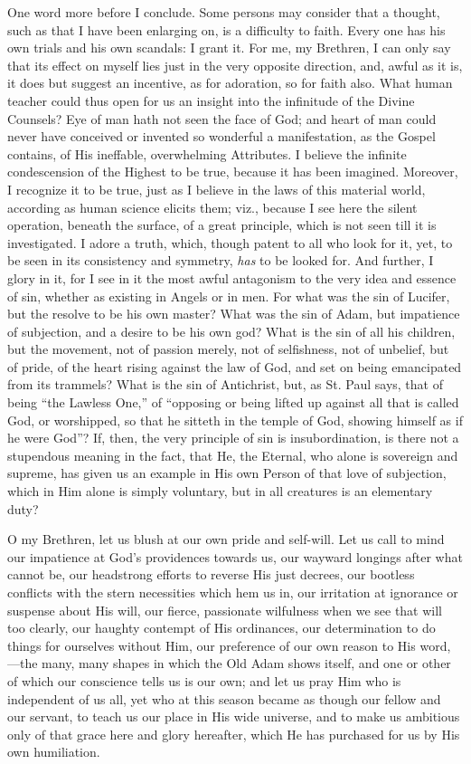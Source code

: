 One word more before I conclude. Some persons may
consider that a thought, such as that I have been
enlarging on, is a difficulty to faith. Every one has his
own trials and his own scandals: I grant it. For me, my
Brethren, I can only say that its effect on myself lies
just in the very opposite direction, and, awful as it is,
it does but suggest an incentive, as for adoration, so
for faith also. What human teacher could thus open for us
an insight into the infinitude of the Divine Counsels?
Eye of man hath not seen the face of God; and heart of
man could never have conceived or invented so wonderful a
manifestation, as the Gospel contains, of His ineffable,
overwhelming Attributes. I believe the infinite
condescension of the Highest to be true, because it has
been imagined. Moreover, I recognize it to be true, just
as I believe in the laws of this material world,
according as human science elicits them; viz., because I
see here the silent operation, beneath the surface, of a
great principle, which is not seen till it is
investigated. I adore a truth, which, though patent to
all who look for it, yet, to be seen in its consistency
and symmetry, \emph{has} to be looked for. And further, I
glory in it, for I see in it the most awful antagonism to
the very idea and essence of sin, whether as existing in
Angels or in men. For what was the sin of Lucifer, but
the resolve to be his own master? What was the sin of
Adam, but impatience of subjection, and a desire to be
his own god? What is the sin of all his children, but the
movement, not of passion merely, not of selfishness, not
of unbelief, but of pride, of the heart rising against
the law of God, and set on being emancipated from its
trammels? What is the sin of Antichrist, but, as St. Paul
says, that of being ``the Lawless One,'' of
``opposing or being lifted up against all that is
called God, or worshipped, so that he sitteth in the
temple of God, showing himself as if he were God''?
If, then, the very principle of sin is insubordination,
is there not a stupendous meaning in the fact, that He,
the Eternal, who alone is sovereign and supreme, has
given us an example in His own Person of that love of
subjection, which in Him alone is simply voluntary, but
in all creatures is an elementary duty?

O my Brethren, let us blush at our own pride and
self-will. Let us call to mind our impatience at God's
providences towards us, our wayward longings after what
cannot be, our headstrong efforts to reverse His just
decrees, our bootless conflicts with the stern
necessities which hem us in, our irritation at ignorance
or suspense about His will, our fierce, passionate
wilfulness when we see that will too clearly, our haughty
contempt of His ordinances, our determination to do
things for ourselves without Him, our preference of our
own reason to His word,—the many, many shapes in
which the Old Adam shows itself, and one or other of
which our conscience tells us is our own; and let us pray
Him who is independent of us all, yet who at this season
became as though our fellow and our servant, to teach us
our place in His wide universe, and to make us ambitious
only of that grace here and glory hereafter, which He has
purchased for us by His own humiliation.

